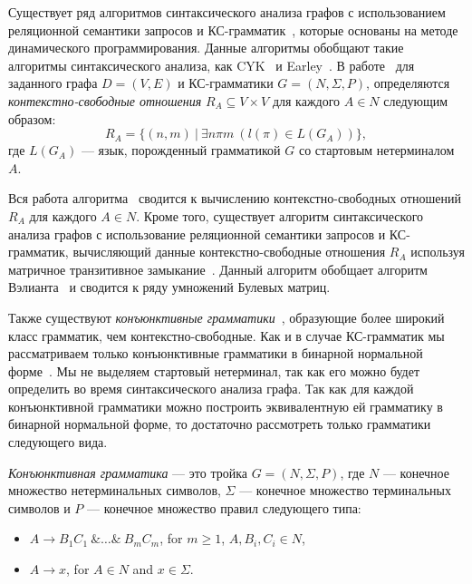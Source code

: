 \documentclass [a4paper] {article}
\begin{document}
	Существует ряд алгоритмов синтаксического анализа графов с использованием реляционной семантики запросов и КС-грамматик~\cite{hellingsRelational, RDF, GraphQueryWithEarley}, которые основаны на методе динамического программирования. Данные алгоритмы обобщают такие алгоритмы синтаксического анализа, как CYK~\cite{kasami, younger} и Earley~\cite{Grune}. В работе~\cite{hellingsRelational} для заданного графа $D = (V, E)$ и КС-грамматики $G = (N, \Sigma, P)$, определяются \textit{контекстно-свободные отношения} $R_A \subseteq V \times V$ для каждого $A \in N$ следующим образом: $$R_A = \{(n,m)~|~\exists n \pi m~(l(\pi) \in L(G_A))\},$$ где $L(G_A)$ --- язык, порожденный грамматикой $G$ со стартовым нетерминалом $A$.
	
	Вся работа алгоритма~\cite{hellingsRelational} сводится к вычислению контекстно-свободных отношений $R_A$ для каждого $A \in N$. Кроме того, существует алгоритм синтаксического анализа графов с использование реляционной семантики запросов и КС-грамматик, вычисляющий данные контекстно-свободные отношения $R_A$ используя матричное транзитивное замыкание~\cite{azimov2018context}. Данный алгоритм обобщает алгоритм Вэлианта~\cite{valiant} и сводится к ряду умножений Булевых матриц.
	
	Также существуют \textit{конъюнктивные грамматики}~\cite{okhotin2001conjunctive}, образующие более широкий класс грамматик, чем контекстно-свободные. Как и в случае КС-грамматик мы рассматриваем только конъюнктивные грамматики в бинарной нормальной форме~\cite{okhotinConjAndBool}. Мы не выделяем стартовый нетерминал, так как его можно будет определить во время синтаксического анализа графа. Так как для каждой конъюнктивной грамматики можно построить эквивалентную ей грамматику в бинарной нормальной форме, то достаточно рассмотреть только грамматики следующего вида.
	
	\textit{Конъюнктивная грамматика} --- это тройка $G = (N, \Sigma, P)$, где $N$ --- конечное множество нетерминальных символов, $\Sigma$ --- конечное множество терминальных символов и $P$ --- конечное множество правил следующего типа:
	
	\begin{itemize}
		\item $A \rightarrow B_1 C_1~\& \ldots \&~B_m C_m$, for $m \geq 1$, $A,B_i,C_i \in N$,
		\item $A \rightarrow x$, for $A \in N$ and $x \in \Sigma$.   
	\end{itemize}
\end{document}
